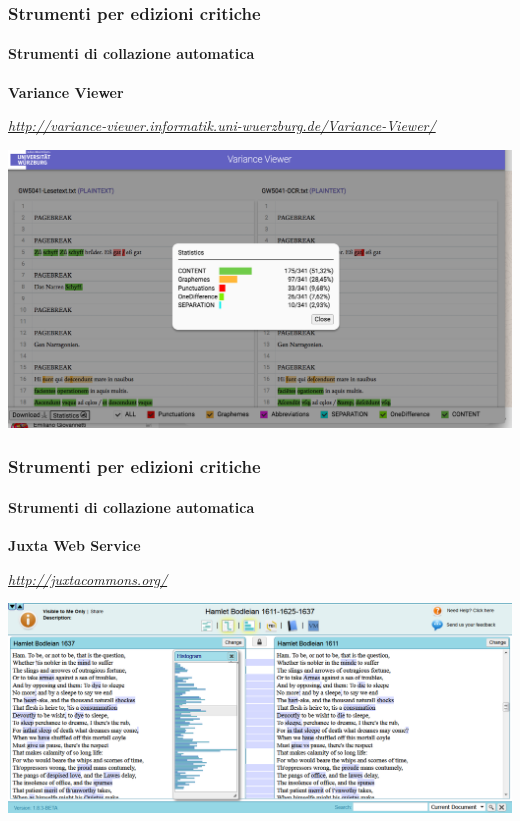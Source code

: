 \begin{frame}
    \frametitle{Strumenti per edizioni critiche}
    \framesubtitle{Strumenti di collazione automatica}
	\addtocounter{nframe}{1}
    \begin{center}
        \textbf{Variance Viewer}
    \end{center}
    \begin{center}
        \textit{\url{http://variance-viewer.informatik.uni-wuerzburg.de/Variance-Viewer/}}
	\end{center}
    \begin{center}
        \includegraphics[width=.95\textwidth]{imgs/variance-viewer.png}
	\end{center}
\end{frame}

\begin{frame}
    \frametitle{Strumenti per edizioni critiche}
    \framesubtitle{Strumenti di collazione automatica}
	\addtocounter{nframe}{1}
    \begin{center}
        \textbf{Juxta Web Service}
    \end{center}
    \begin{center}
        \textit{\url{http://juxtacommons.org/}}
	\end{center}
    \begin{center}
        \includegraphics[width=.95\textwidth]{imgs/juxtaweb.png}
	\end{center}
\end{frame}

